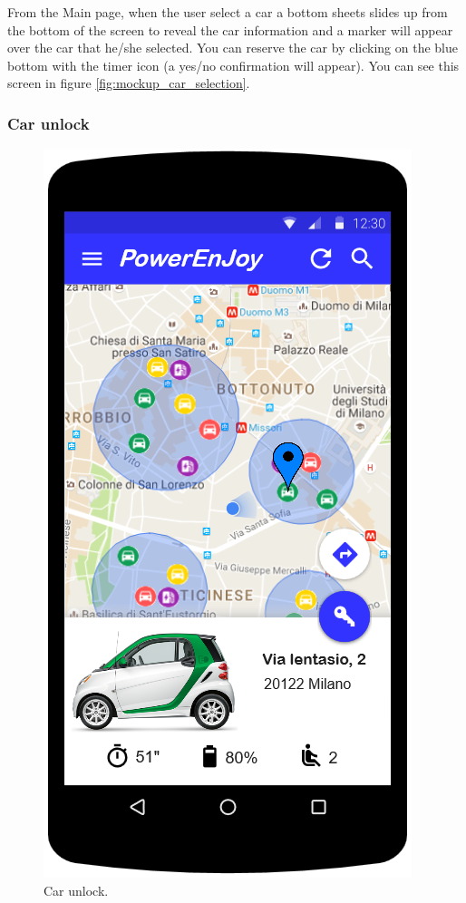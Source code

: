 From the Main page, when the user select a car a bottom sheets slides up from the bottom of the screen to reveal the car information and a marker will appear over the car that he/she selected. You can reserve the car by clicking on the blue bottom with the timer icon (a yes/no confirmation will appear). You can see this screen in figure \ref{fig:mockup_car_selection}.

\subsubsection*{Car unlock}

\begin{figure}
	\centering
	\includegraphics[width=\textwidth,height=\dimexpr\textheight-4\baselineskip-\abovecaptionskip-\belowcaptionskip\relax,keepaspectratio]{overall_description/mockup/car_unlock.png}
	\caption{Car unlock.}
	\label{fig:mockup_car_unlock}
\end{figure}

